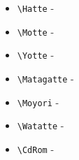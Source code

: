 \documentclass[oneside,10pt,a4paper]{jsarticle}
\begin{document}
\begin{itemize}
    \item \verb|\Hatte| - 
    \item \verb|\Motte| - 
    \item \verb|\Yotte| - 
    \item \verb|\Matagatte| - 
    \item \verb|\Moyori| - 
    \item \verb|\Watatte| - 
    \item \verb|\CdRom| - 
  \end{itemize}
\end{document}
